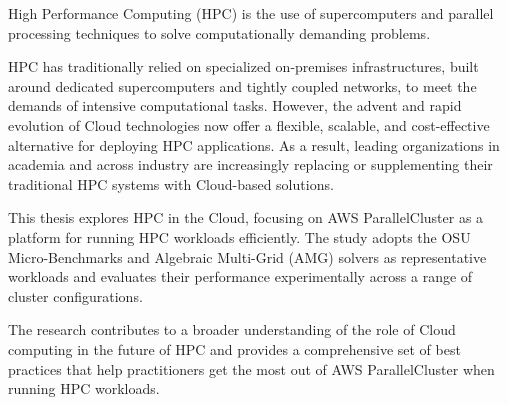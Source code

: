 High Performance Computing (HPC) is the use of supercomputers and parallel processing techniques to solve
computationally demanding problems.

HPC has traditionally relied on specialized on-premises infrastructures, built around dedicated supercomputers
and tightly coupled networks, to meet the demands of intensive computational tasks. However, the advent and
rapid evolution of Cloud technologies now offer a flexible, scalable, and cost-effective alternative for
deploying HPC applications. As a result, leading organizations in academia and across industry are
increasingly replacing or supplementing their traditional HPC systems with Cloud-based solutions.

This thesis explores HPC in the Cloud, focusing on AWS ParallelCluster as a platform for running HPC workloads
efficiently. The study adopts the OSU Micro-Benchmarks and Algebraic Multi-Grid (AMG) solvers as representative
workloads and evaluates their performance experimentally across a range of cluster configurations.

The research contributes to a broader understanding of the role of Cloud computing in the future of HPC and
provides a comprehensive set of best practices that help practitioners get the most out of AWS ParallelCluster
when running HPC workloads.
